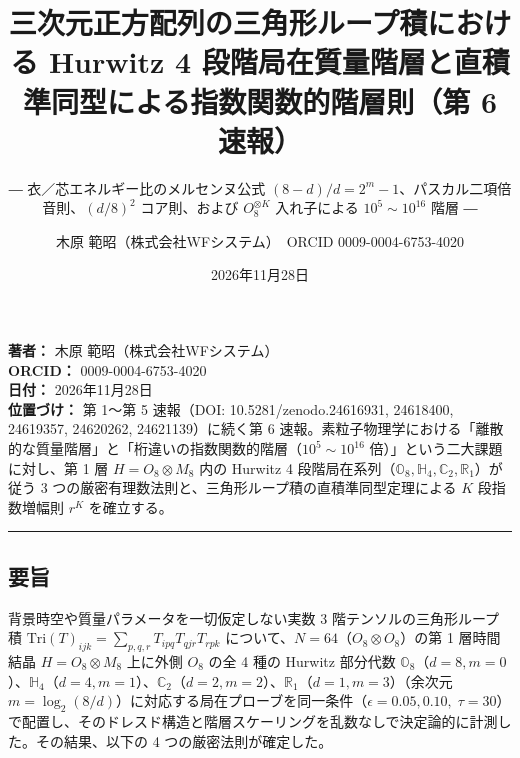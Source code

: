 \documentclass[
  a4paper,
]{ltjsarticle}
\title{三次元正方配列の三角形ループ積における Hurwitz 4
段階局在質量階層と直積準同型による指数関数的階層則（第 6 速報）}
\subtitle{― 衣／芯エネルギー比のメルセンヌ公式
\((8-d)/d = 2^m - 1\)、パスカル二項倍音則、\((d/8)^2\) コア則、および
\(O_8^{\otimes K}\) 入れ子による \(10^5 \sim 10^{16}\) 階層 ―}
\author{木原 範昭（株式会社WFシステム）　ORCID 0009-0004-6753-4020}
\date{2026年11月28日}
\begin{document}
\maketitle

\textbf{著者：} 木原 範昭（株式会社WFシステム）\\
\textbf{ORCID：} 0009-0004-6753-4020\\
\textbf{日付：} 2026年11月28日\\
\textbf{位置づけ：} 第 1〜第 5 速報（DOI: 10.5281/zenodo.24616931,
24618400, 24619357, 24620262, 24621139）に続く第 6
速報。素粒子物理学における「離散的な質量階層」と「桁違いの指数関数的階層（\(10^5 \sim 10^{16}\)
倍）」という二大課題に対し、第 1 層 \(H = O_8 \otimes M_8\) 内の Hurwitz
4
段階局在系列（\(\mathbb{O}_8, \mathbb{H}_4, \mathbb{C}_2, \mathbb{R}_1\)）が従う
3 つの厳密有理数法則と、三角形ループ積の直積準同型定理による \(K\)
段指数増幅則 \(r^K\) を確立する。

\begin{center}\rule{0.5\linewidth}{0.5pt}\end{center}

\subsection{要旨}\label{ux8981ux65e8}

背景時空や質量パラメータを一切仮定しない実数 3
階テンソルの三角形ループ積
\(\mathrm{Tri}(T)_{ijk} = \sum_{p,q,r} T_{ipq} T_{qjr} T_{rpk}\)
について、\(N = 64\)（\(O_8 \otimes O_8\)）の第 1 層時間結晶
\(H = O_8 \otimes M_8\) 上に外側 \(O_8\) の全 4 種の Hurwitz 部分代数
\(\mathbb{O}_8\)（\(d=8, m=0\)）、\(\mathbb{H}_4\)（\(d=4, m=1\)）、\(\mathbb{C}_2\)（\(d=2, m=2\)）、\(\mathbb{R}_1\)（\(d=1, m=3\)）（余次元
\(m = \log_2(8/d)\)）に対応する局在プローブを同一条件（\(\epsilon = 0.05, 0.10,\; \tau = 30\)）で配置し、そのドレスド構造と階層スケーリングを乱数なしで決定論的に計測した。その結果、以下の
4 つの厳密法則が確定した。
\end{document}
